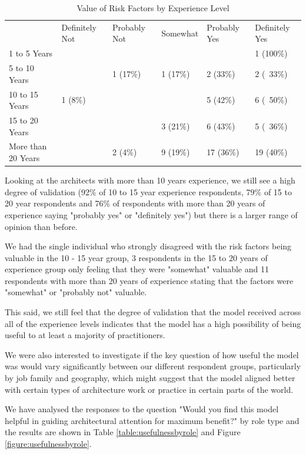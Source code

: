 \begin{table}
\caption{Value of Risk Factors by Experience Level}
\label{table:valueofriskfactors}
\footnotesize
\begin{tabular}{l P{1.5cm} P{1.5cm} P{1.5cm} P{1.5cm} P{1.5cm}}
 & Definitely Not & Probably Not & Somewhat & Probably Yes & Definitely Yes \\
1 to 5 Years       &         &          &          &           & 1 (100\%) \\
5 to 10 Years      &         & 1 (17\%) & 1 (17\%) & 2 (33\%)  & 2 (~33\%) \\
10 to 15 Years     & 1 (8\%) &          &          & 5 (42\%)  & 6 (~50\%) \\
15 to 20 Years     &         &          & 3 (21\%) & 6 (43\%)  & 5 (~36\%) \\
More than 20 Years &         & 2 (4\%)  & 9 (19\%) & 17 (36\%) & 19 (40\%) \\
\end{tabular}
\end{table}


Looking at the architects with more than 10 years experience, we still see a high degree of validation (92\% of 10 to 15 year experience respondents, 79\% of 15 to 20 year respondents and 76\% of respondents with more than 20 years of experience saying "probably yes" or "definitely yes") but there is a larger range of opinion than before.

We had the single individual who strongly disagreed with the risk factors being valuable in the 10 - 15 year group, 3 respondents in the 15 to 20 years of experience group only feeling that they were "somewhat" valuable and 11 respondents with more than 20 years of experience stating that the factors were "somewhat" or "probably not" valuable.

This said, we still feel that the degree of validation that the model received across all of the experience levels indicates that the model has a high possibility of being useful to at least a majority of practitioners.

We were also interested to investigate if the key question of how useful the model was would vary significantly between our different respondent groups, particularly by job family and geography, which might suggest that the model aligned better with certain types of architecture work or practice in certain parts of the world.

We have analysed the responses to the question "Would you find this model helpful in guiding architectural attention for maximum benefit?" by role type and the results are shown in Table \ref{table:usefulnessbyrole} and Figure \ref{figure:usefulnessbyrole}.

